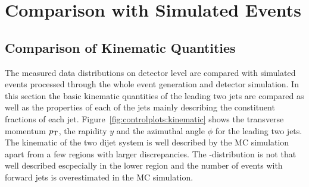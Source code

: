 \section{Comparison with Simulated Events}

\subsection{Comparison of Kinematic Quantities}

The measured data distributions on detector level are compared with simulated events
processed through the whole event generation and detector simulation. In this section
the basic kinematic quantities of the leading two jets are compared as well as the properties
of each of the jets mainly describing the constituent fractions of each jet. Figure~\ref{fig:controlplots:kinematic}
shows the transverse momentum $p_{\mathrm{T}}$, the rapidity $y$ and the azimuthal angle $\phi$ for the leading
two jets. The kinematic of the two dijet system is well described by the MC simulation apart from
a few regions with larger discrepancies. The \pt-distribution is not that well described escpecially in
the lower \pt region and the number of events with forward jets is overestimated in the MC simulation.

